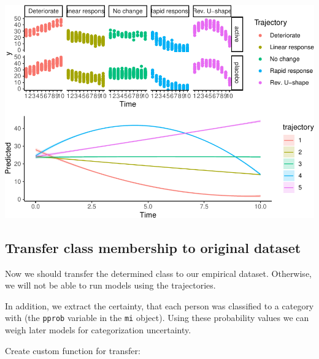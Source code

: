\documentclass[
]{book}
\begin{document}
\includegraphics{DZP_R_bookdown_files/figure-latex/unnamed-chunk-37-1.pdf}

\hypertarget{transfer-class-membership-to-original-dataset}{%
\subsection{Transfer class membership to original dataset}\label{transfer-class-membership-to-original-dataset}}

Now we should transfer the determined class to our empirical dataset. Otherwise, we will not be able to run models using the trajectories.

In addition, we extract the certainty, that each person was classified to a category with (the \texttt{pprob} variable in the \texttt{mi} object). Using these probability values we can weigh later models for categorization uncertainty.

Create custom function for transfer:
\end{document}
